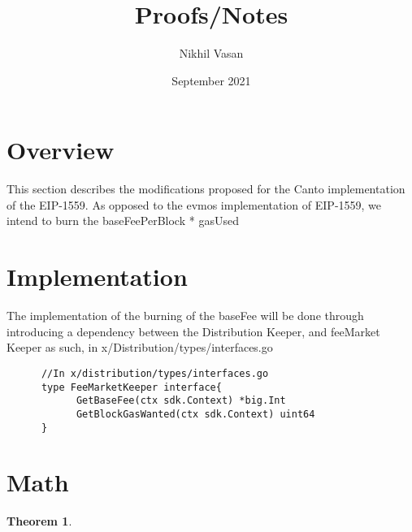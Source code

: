 \documentclass{amsart}
\title{Proofs/Notes}
\author{Nikhil Vasan}
\date{September 2021}
\numberwithin{equation}{section}
\theoremstyle{plain}
\newtheorem{thm}{Theorem}[section]
\theoremstyle{definition}
\begin{document}
\maketitle
\section{Overview}
This section describes the modifications proposed for the Canto implementation of the EIP-1559. As opposed to the 
evmos implementation of EIP-1559, we intend to burn the baseFeePerBlock * gasUsed 
\section{Implementation}    
The implementation of the burning of the baseFee will be done through introducing a dependency between the Distribution Keeper, and feeMarket Keeper as such, in x/Distribution/types/interfaces.go
\begin{lstlisting}
      //In x/distribution/types/interfaces.go
      type FeeMarketKeeper interface{ 
            GetBaseFee(ctx sdk.Context) *big.Int
            GetBlockGasWanted(ctx sdk.Context) uint64
      }
\end{lstlisting}

\section{Math}

\begin{thm}
      
\end{thm}
\end{document}
